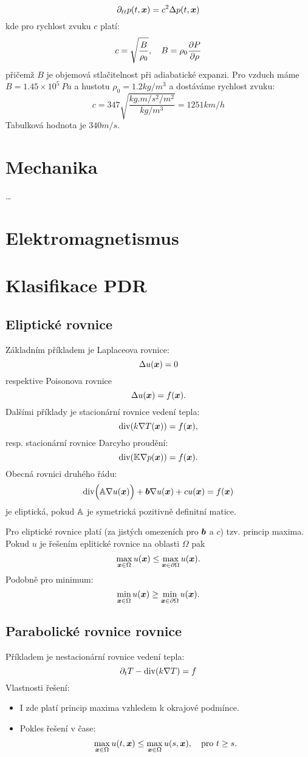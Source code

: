 \[
    \partial_{tt} p(t, \mathbf{\boldsymbol{x}}) = c^2 \Delta p(t, \mathbf{\boldsymbol{x}})
\]
kde pro rychlost zvuku $c$ platí:
\[
    c = \sqrt{\frac{B}{\rho_0}},\quad B = \rho_0 \frac{\partial P}{\partial \rho}
\]
přičemž $B$ je objemová stlačitelnost při adiabatické expanzi. Pro vzduch máme $B=1.45\times 10^5\ Pa$ a hustotu $\rho_0 = 1.2kg/m^3$ a dostáváme rychlost zvuku:
\[
    c=347 \sqrt{\frac{kg.m/s^2/m^2}{kg/m^3}} = 1251 km/h
\]
Tabulková hodnota je $340m/s$.








\section{Mechanika}
\dots
\section{Elektromagnetismus}

\section{Klasifikace PDR}

\subsection{Eliptické rovnice}
Základním příkladem je Laplaceova rovnice:
\[
    \Delta u(\mathbf{\boldsymbol{x}}) = 0
\]
respektive Poisonova rovnice
\[
    \Delta u(\mathbf{\boldsymbol{x}}) = f(\mathbf{\boldsymbol{x}}).
\]
Dalšími příklady je stacionární rovnice vedení tepla:
\[
    {\rm div}( k \nabla T(\mathbf{\boldsymbol{x}}) ) = f(\mathbf{\boldsymbol{x}}),
\]
resp. stacionární rovnice Darcyho proudění:
\[
    {\rm div}( {\mathbb{K}} \nabla p(\mathbf{\boldsymbol{x}})) = f(\mathbf{\boldsymbol{x}}).
\]
Obecná rovnici druhého řádu:
\[
  {\rm div}\Big( {\mathbb{A}} \nabla u(\mathbf{\boldsymbol{x}})\Big) + \mathbf{\boldsymbol{b}} \nabla u(\mathbf{\boldsymbol{x}}) + c u(\mathbf{\boldsymbol{x}})= f(\mathbf{\boldsymbol{x}})
\]
je eliptická, pokud ${\mathbb{A}}$ je symetrická pozitivně definitní matice.

Pro eliptické rovnice platí (za jistých omezeních pro $\mathbf{\boldsymbol{b}}$ a $c$) tzv. princip maxima. Pokud $u$ je řešením eplitické rovnice na oblasti $\Omega$
pak 
\[
    \max_{\mathbf{\boldsymbol{x}} \in \Omega} u(\mathbf{\boldsymbol{x}}) \le \max_{\mathbf{\boldsymbol{x}} \in \partial \Omega}  u(\mathbf{\boldsymbol{x}}).
\]
Podobně pro minimum:
\[
    \min_{\mathbf{\boldsymbol{x}} \in \Omega} u(\mathbf{\boldsymbol{x}}) \ge \min_{\mathbf{\boldsymbol{x}} \in \partial \Omega}  u(\mathbf{\boldsymbol{x}}).
\]


\subsection{Parabolické rovnice rovnice}
Příkladem je nestacionární rovnice vedení tepla:
\[
    \partial_t T -{\rm div}(k \nabla T) = f
\]
Vlastnosti řešení:
\begin{itemize}
 \item I zde platí princip maxima vzhledem k okrajové podmínce.
 \item Pokles řešení v čase:
    \[
        \max_{\mathbf{\boldsymbol{x}} \in \Omega} u(t, \mathbf{\boldsymbol{x}})   \le \max_{\mathbf{\boldsymbol{x}} \in \Omega}  u(s, \mathbf{\boldsymbol{x}}),\quad \text{pro } t\ge s.
    \]
\end{itemize}


